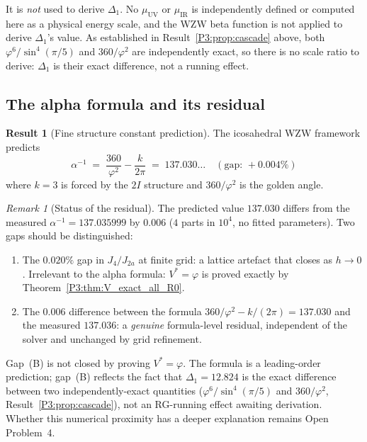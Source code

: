\documentclass[11pt,a4paper]{article}
\theoremstyle{definition}
\newtheorem{result}[theorem]{Result}
\theoremstyle{remark}
\newtheorem{remark}[theorem]{Remark}
\newcommand{\vp}{\varphi}
\newcommand{\aInv}{\alpha^{-1}}
\begin{document}
It is \emph{not} used to derive $\Delta_1$. No $\mu_{\mathrm{UV}}$ or
$\mu_{\mathrm{IR}}$ is independently defined or computed here as a
physical energy scale, and the WZW beta function is not applied to
derive $\Delta_1$'s value. As established in Result~\ref{P3:prop:cascade}
above, both $\vp^6/\sin^4(\pi/5)$ and $360/\vp^2$ are independently
exact, so there is no scale ratio to derive: $\Delta_1$ is their exact
difference, not a running effect.

\subsection{The alpha formula and its residual}

\begin{result}[Fine structure constant prediction]
\label{P3:res:alpha}
The icosahedral WZW framework predicts
\begin{equation}
  \boxed{\aInv \;=\; \frac{360}{\vp^2} - \frac{k}{2\pi}
         \;=\; 137.030\ldots\quad(\text{gap: }+0.004\%)}
  \label{P3:eq:alpha_formula}
\end{equation}
where $k=3$ is forced by the $2I$ structure and $360/\vp^2$ is the golden angle.
\end{result}

\begin{remark}[Status of the residual]
\label{P3:rem:residual_status}
The predicted value $137.030$ differs from the measured $\aInv = 137.035999$
by $0.006$ ($4$ parts in $10^4$, no fitted parameters).
Two gaps should be distinguished:
\begin{enumerate}[noitemsep,label=(\Alph*)]
  \item The $0.020\%$ gap in $J_4/J_{2a}$ at finite grid: a lattice artefact
    that closes as $h\to 0$.  Irrelevant to the alpha formula: $V^*=\vp$ is
    proved exactly by Theorem~\ref{P3:thm:V_exact_all_R0}.
  \item The $0.006$ difference between the formula $360/\vp^2 - k/(2\pi) = 137.030$
    and the measured $137.036$: a \emph{genuine} formula-level residual,
    independent of the solver and unchanged by grid refinement.
\end{enumerate}
Gap~(B) is not closed by proving $V^*=\vp$.  The formula is a leading-order
prediction; gap~(B) reflects the fact that $\Delta_1=12.824$ is the exact
difference between two independently-exact quantities
($\vp^6/\sin^4(\pi/5)$ and $360/\vp^2$, Result~\ref{P3:prop:cascade}),
not an RG-running effect awaiting derivation. Whether this numerical
proximity has a deeper explanation remains Open Problem~4.
\end{remark}
\end{document}
